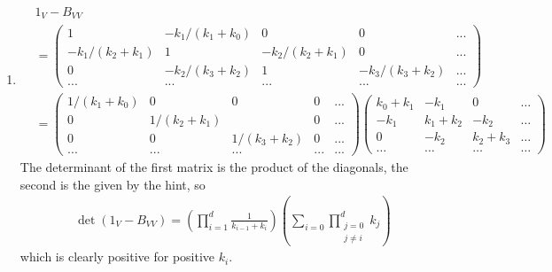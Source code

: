 \begin{enumerate}
\begin{ungradedsolution}
\begin{enumerate}
			\item
			\begin{align*}
				 & 1_V-B_{VV}                                                                       \\
				 & =\begin{pmatrix}
					    1                & -k_1/(k_1+k_0)   & 0                & 0                & ... \\
					    -k_1 / (k_2+k_1) & 1                & -k_2 / (k_2+k_1) & 0                & ... \\
					    0                & -k_2 / (k_3+k_2) & 1                & -k_3 / (k_3+k_2) & ... \\
					    ...              & ...              & ...              & ...              & ...
				    \end{pmatrix} \\
				 & =\begin{pmatrix}
					    1/(k_1+k_0) & 0            & 0             & 0   & ... \\
					    0           & 1/ (k_2+k_1) &               & 0   & ... \\
					    0           & 0            & 1 / (k_3+k_2) & 0   & ... \\
					    ...         & ...          & ...           & ... & ...
				    \end{pmatrix}
				\begin{pmatrix}
					k_0+k_1 & -k_1      & 0         & \dots \\
					-k_1    & k_1 + k_2 & -k_2      & \dots \\
					0       & -k_2      & k_2 + k_3 & \dots \\
					\dots   & \dots     & \dots     & \dots
				\end{pmatrix}
			\end{align*}
			The determinant of the first matrix is the product of the diagonals, the second is the given by the hint, so
			\begin{align*}
				\det (1_V - B_{VV}) = \left(\prod_{i=1}^d \frac{1}{k_{i-1}+k_i}\right)\left(\sum_{i=0}\prod_{\substack{j = 0 \\j\neq i}}^d k_j\right)
			\end{align*}
			which is clearly positive for positive $k_i$.


\end{enumerate}
\end{ungradedsolution}
\end{enumerate}
